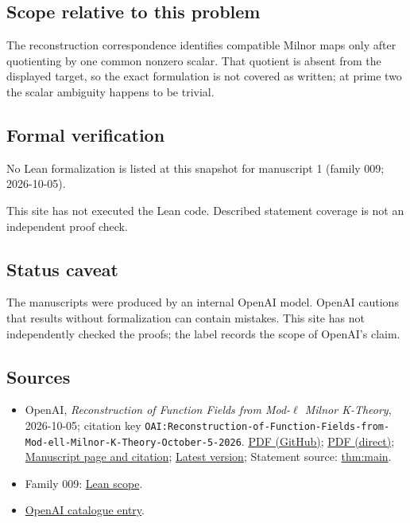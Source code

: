 \documentclass[11pt]{article}
\begin{document}
\subsection{Scope relative to this problem}
The reconstruction correspondence identifies compatible Milnor maps only after quotienting by one common nonzero scalar. That quotient is absent from the displayed target, so the exact formulation is not covered as written; at prime two the scalar ambiguity happens to be trivial.

\subsection{Formal verification}
No Lean formalization is listed at this snapshot for manuscript 1 (family 009; 2026-10-05).

This site has not executed the Lean code. Described statement coverage is not an independent proof check.

\subsection{Status caveat}
The manuscripts were produced by an internal OpenAI model. OpenAI cautions that results without formalization can contain mistakes. This site has not independently checked the proofs; the label records the scope of OpenAI's claim.

\subsection{Sources}
\begin{itemize}
\item OpenAI, \emph{Reconstruction of Function Fields from Mod-\(\ell\) Milnor K-Theory}, 2026-10-05; citation key \texttt{OAI:Reconstruction-of-Function-Fields-from-Mod-ell-Milnor-K-Theory-October-5-2026}. \href{https://github.com/openai/math/blob/adc7f1241b42e322a6451854ab7e4b4c146bf78a/preprints/Reconstruction-of-Function-Fields-from-Mod-ell-Milnor-K-Theory-October-5-2026/mod-ell-bogomolov-pop.pdf}{PDF (GitHub)}; \href{https://github.com/openai/math/raw/adc7f1241b42e322a6451854ab7e4b4c146bf78a/preprints/Reconstruction-of-Function-Fields-from-Mod-ell-Milnor-K-Theory-October-5-2026/mod-ell-bogomolov-pop.pdf}{PDF (direct)}; \href{https://github.com/openai/math/blob/adc7f1241b42e322a6451854ab7e4b4c146bf78a/preprints/Reconstruction-of-Function-Fields-from-Mod-ell-Milnor-K-Theory-October-5-2026/README.md}{Manuscript page and citation}; \href{https://github.com/openai/math/blob/main/preprints/Reconstruction-of-Function-Fields-from-Mod-ell-Milnor-K-Theory-October-5-2026/mod-ell-bogomolov-pop.pdf}{Latest version}; Statement source: \href{https://github.com/openai/math/blob/adc7f1241b42e322a6451854ab7e4b4c146bf78a/preprints/Reconstruction-of-Function-Fields-from-Mod-ell-Milnor-K-Theory-October-5-2026/build/sections/01-introduction.tex\#L64}{thm:main}.
\item Family 009: \href{https://github.com/openai/math/blob/adc7f1241b42e322a6451854ab7e4b4c146bf78a/lean/docs/009.md}{Lean scope}.
\item \href{https://github.com/openai/math/blob/adc7f1241b42e322a6451854ab7e4b4c146bf78a/CONTENTS.md}{OpenAI catalogue entry}.
\end{itemize}
\end{document}
